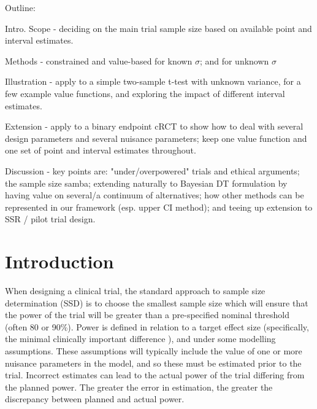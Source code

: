 \documentclass[sagev, Crown]{sagej}
\begin{document}

\maketitle

Outline:

Intro. Scope - deciding on the main trial sample size based on available point and interval estimates.

Methods - constrained and value-based for known $\sigma$; and for unknown $\sigma$

Illustration - apply to a simple two-sample t-test with unknown variance, for a few example value functions, and exploring the impact of different interval estimates.

Extension - apply to a binary endpoint cRCT to show how to deal with several design parameters and several nuisance parameters; keep one value function and one set of point and interval estimates throughout.

Discussion - key points are: "under/overpowered" trials and ethical arguments; the sample size samba; extending naturally to Bayesian DT formulation by having value on several/a continuum of alternatives; how other methods can be represented in our framework (esp. upper CI method); and teeing up extension to SSR / pilot trial design.


\section{Introduction}\label{sec:intro}

When designing a clinical trial, the standard approach to sample size determination (SSD) is to choose the smallest sample size which will ensure that the power of the trial will be greater than a pre-specified nominal threshold (often 80 or 90\%). Power is defined in relation to a target effect size (specifically, the minimal clinically important difference \cite{Cook2018}), and under some modelling assumptions. These assumptions will typically include the value of one or more nuisance parameters in the model, and so these must be estimated prior to the trial. Incorrect estimates can lead to the actual power of the trial differing from the planned power. The greater the error in estimation, the greater the discrepancy between planned and actual power.
\end{document}
